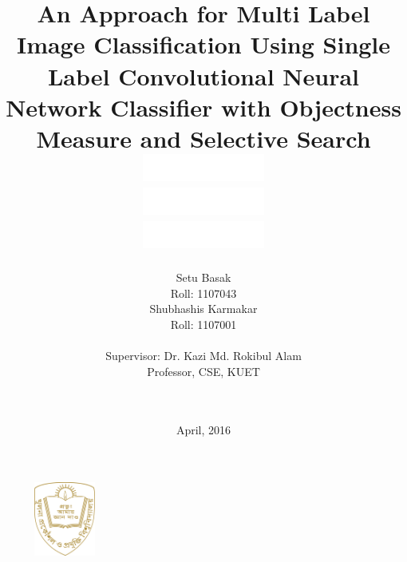 \documentclass[12pt]{report}
\theoremstyle{plain}
\theoremstyle{definition}
\begin{document}
\setcounter{page}{1}


%
%
\begin{figure}
  \centering
  \includegraphics[width=2cm]{kuetlogo.png}
\end{figure}

\title{
    {An Approach for Multi Label Image Classification Using Single Label Convolutional Neural Network Classifier with Objectness Measure and Selective Search}\\
    {\includegraphics[width=4cm]{gap.png}}\\
    {\includegraphics[width=4cm]{gap.png}}\\
    {\includegraphics[width=4cm]{gap.png}}\\
}

\author{Setu Basak\\
        Roll: 1107043\\
        Shubhashis Karmakar\\
        Roll: 1107001\\\\
        Supervisor: Dr. Kazi Md. Rokibul Alam\\
        Professor, CSE, KUET\\\\\\
}

\date{April, 2016}
%



\setlength{\parindent}{1em}
\end{document}
